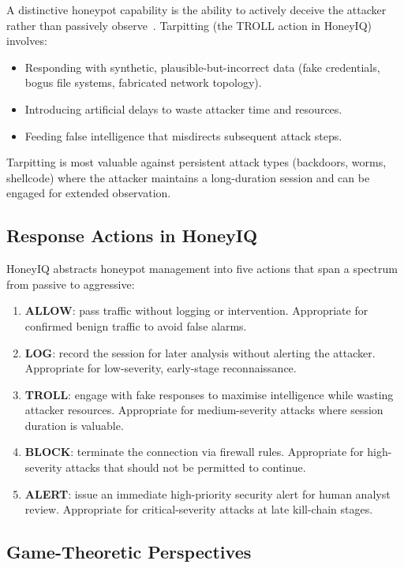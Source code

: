A distinctive honeypot capability is the ability to actively deceive the
attacker rather than passively observe~\citep{provos2004virtual}.
Tarpitting (the TROLL action in HoneyIQ) involves:
%
\begin{itemize}
  \item Responding with synthetic, plausible-but-incorrect data (fake
        credentials, bogus file systems, fabricated network topology).
  \item Introducing artificial delays to waste attacker time and resources.
  \item Feeding false intelligence that misdirects subsequent attack steps.
\end{itemize}
%
Tarpitting is most valuable against persistent attack types (backdoors,
worms, shellcode) where the attacker maintains a long-duration session and
can be engaged for extended observation.

\subsection{Response Actions in HoneyIQ}

HoneyIQ abstracts honeypot management into five actions that span a spectrum
from passive to aggressive:

\begin{enumerate}
  \item \textbf{ALLOW}: pass traffic without logging or intervention.
        Appropriate for confirmed benign traffic to avoid false alarms.
  \item \textbf{LOG}: record the session for later analysis without alerting
        the attacker.
        Appropriate for low-severity, early-stage reconnaissance.
  \item \textbf{TROLL}: engage with fake responses to maximise intelligence
        while wasting attacker resources.
        Appropriate for medium-severity attacks where session duration is
        valuable.
  \item \textbf{BLOCK}: terminate the connection via firewall rules.
        Appropriate for high-severity attacks that should not be permitted
        to continue.
  \item \textbf{ALERT}: issue an immediate high-priority security alert for
        human analyst review.
        Appropriate for critical-severity attacks at late kill-chain stages.
\end{enumerate}

\subsection{Game-Theoretic Perspectives}

